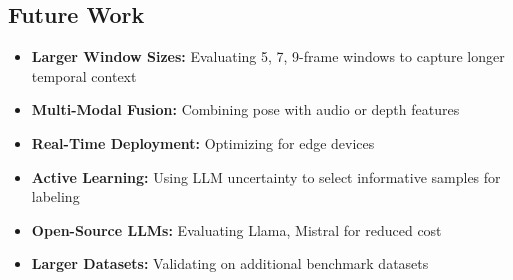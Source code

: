 \documentclass[conference]{IEEEtran}
\begin{document}
\subsection{Future Work}

\begin{itemize}
    \item \textbf{Larger Window Sizes:} Evaluating 5, 7, 9-frame windows to capture longer temporal context
    \item \textbf{Multi-Modal Fusion:} Combining pose with audio or depth features
    \item \textbf{Real-Time Deployment:} Optimizing for edge devices
    \item \textbf{Active Learning:} Using LLM uncertainty to select informative samples for labeling
    \item \textbf{Open-Source LLMs:} Evaluating Llama, Mistral for reduced cost
    \item \textbf{Larger Datasets:} Validating on additional benchmark datasets
\end{itemize}
\end{document}
